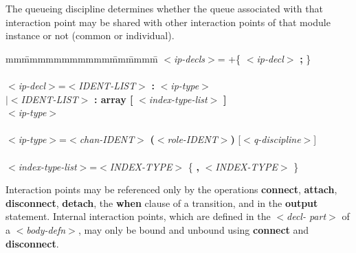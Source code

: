 The queueing discipline determines whether the queue
associated with that interaction point may be shared with
other interaction points of that module instance or not
(common or individual).

\begin{tabbing}
mm\=mmmmmmmmmmm\=mm\=mmmm\=\+\kill
$<${\em ip-decls}$>$\>= +\{ $<${\em ip-decl}$>$ {\bf ;} \}\\
\mbox{}\\
$<${\em ip-decl}$>$\>=\>$<${\em IDENT-LIST}$>$ {\bf :} $<${\em ip-type}$>$\\
\>\>$|<${\em IDENT-LIST}$>$ {\bf : array [} $<${\em index-type-list}$>$ {\bf
]}\\
\>\> $<${\em ip-type}$>$\\
\mbox{}\\
$<${\em ip-type}$>$\>=\>$<${\em chan-IDENT}$>$ {\bf (}$<${\em role-IDENT}$>${\bf )}
[$<${\em q-discipline}$>$]\\
\mbox{}\\
$<${\em index-type-list}$>$\>=\>$<${\em INDEX-TYPE}$>$ \{ {\bf ,} $<${\em INDEX-TYPE}$>$
\}\\
\end{tabbing}

Interaction points may be referenced only by the
operations {\bf connect}, {\bf attach}, {\bf disconnect}, {\bf
detach}, the {\bf when}
clause of a transition, and in the {\bf output} statement.
Internal interaction points, which are defined in the $<${\em decl-
part}$>$ of a $<${\em body-defn}$>$, may only be bound and unbound using
{\bf connect} and {\bf disconnect}.

